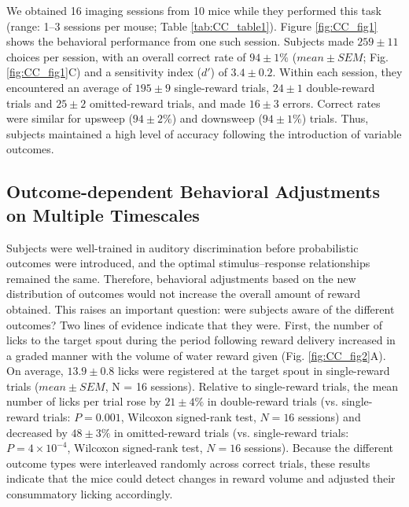 We obtained 16 imaging sessions from 10 mice while they performed this task (range: 1--3 sessions per mouse; Table \ref{tab:CC_table1}). Figure \ref{fig:CC_fig1} shows the behavioral performance from one such session. Subjects made $259 \pm 11$ choices per session, with an overall correct rate of $94 \pm 1\%$ ($mean \pm SEM$; Fig. \ref{fig:CC_fig1}C) and a sensitivity index ($d'$) of $3.4 \pm 0.2$. Within each session, they encountered an average of $195 \pm 9$ single-reward trials, $24 \pm 1$ double-reward trials and $25 \pm 2$ omitted-reward trials, and made $16 \pm 3$ errors. Correct rates were similar for upsweep ($94 \pm 2\%$) and downsweep ($94 \pm 1\%$) trials. Thus, subjects maintained a high level of accuracy following the introduction of variable outcomes.

\subsection[Outcome-dependent Behavioral Adjustments]
{Outcome-dependent Behavioral Adjustments on Multiple Timescales}
Subjects were well-trained in auditory discrimination before probabilistic outcomes were introduced, and the optimal stimulus–response relationships remained the same. Therefore, behavioral adjustments based on the new distribution of outcomes would not increase the overall amount of reward obtained. This raises an important question: were subjects aware of the different outcomes? Two lines of evidence indicate that they were. First, the number of licks to the target spout during the period following reward delivery increased in a graded manner with the volume of water reward given (Fig. \ref{fig:CC_fig2}A). On average, $13.9 \pm 0.8$ licks were registered at the target spout in single-reward trials ($mean \pm SEM$, N = 16 sessions). Relative to single-reward trials, the mean number of licks per trial rose by $21 \pm 4\%$ in double-reward trials (vs. single-reward trials: $P = 0.001$, Wilcoxon signed-rank test, $N = 16$ sessions) and decreased by $48 \pm 3\%$ in omitted-reward trials (vs. single-reward trials: $P = 4 \times 10^{-4}$, Wilcoxon signed-rank test, $N = 16$ sessions). Because the different outcome types were interleaved randomly across correct trials, these results indicate that the mice could detect changes in reward volume and adjusted their consummatory licking accordingly.



